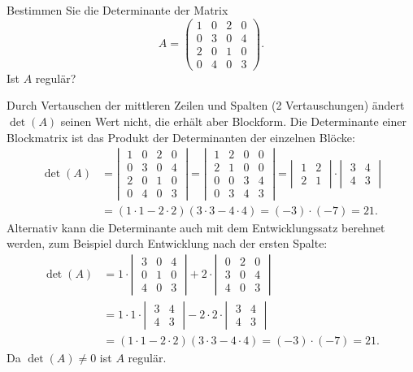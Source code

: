 Bestimmen Sie die Determinante der Matrix
\[
A=\begin{pmatrix}
1&0&2&0\\
0&3&0&4\\
2&0&1&0\\
0&4&0&3
\end{pmatrix}.
\]
Ist $A$ regulär?

\begin{loesung}
Durch Vertauschen der mittleren Zeilen und Spalten (2 Vertauschungen) ändert $\det(A)$
seinen Wert nicht, die erhält aber Blockform. Die Determinante einer Blockmatrix ist
das Produkt der Determinanten der einzelnen Blöcke:
\begin{align*}
\det(A)&=
\left|\;\begin{matrix}
1&0&2&0\\
0&3&0&4\\
2&0&1&0\\
0&4&0&3
\end{matrix}\;\right|
=
\left|\;\begin{matrix}
1&2&0&0\\
2&1&0&0\\
0&0&3&4\\
0&3&4&3
\end{matrix}\;\right|
=
\left|\;\begin{matrix}
1&2\\2&1
\end{matrix}\;\right|
\cdot
\left|\;\begin{matrix}
3&4\\4&3
\end{matrix}\;\right|
\\
&=
(1\cdot 1-2\cdot 2)(3\cdot 3-4\cdot 4)=(-3)\cdot(-7)=21.
\end{align*}
Alternativ kann die Determinante auch mit dem Entwicklungssatz
berehnet werden, zum Beispiel durch Entwicklung nach der ersten
Spalte:
\begin{align*}
\det(A)
&=
1\cdot\left|\;\begin{matrix}
3&0&4\\
0&1&0\\
4&0&3
\end{matrix}\;\right|
+
2\cdot\left|\;\begin{matrix}
0&2&0\\
3&0&4\\
4&0&3
\end{matrix}\;\right|
\\
&=
1\cdot 1\cdot\left|\;\begin{matrix}3&4\\4&3\end{matrix}\;\right|
-2\cdot 2\cdot\left|\;\begin{matrix}3&4\\4&3\end{matrix}\;\right|
\\
&=
(1\cdot 1-2\cdot 2)(3\cdot 3-4\cdot 4)=(-3)\cdot(-7)=21.
\end{align*}
Da $\det(A)\ne 0$ ist $A$ regulär.
\end{loesung}

